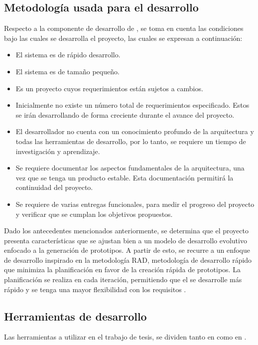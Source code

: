\subsection*{Metodología usada para el desarrollo}
Respecto a la componente de desarrollo de , se toma en cuenta las condiciones bajo las cuales se desarrolla el proyecto, las cuales se expresan a continuación:

\newpage
\begin{itemize}
	\item El sistema es de rápido desarrollo.
	\item El sistema es de tamaño pequeño.
	\item Es un proyecto cuyos requerimientos están sujetos a cambios.
	\item Inicialmente no existe un número total de requerimientos especificado. Estos se irán desarrollando de forma creciente durante el avance del proyecto.
	\item El desarrollador no cuenta con un conocimiento profundo de la arquitectura y todas las herramientas de desarrollo, por lo tanto, se requiere un tiempo de investigación y aprendizaje.   
	\item Se requiere documentar los aspectos fundamentales de la arquitectura, una vez que se tenga un producto estable. Esta documentación permitirá la continuidad del proyecto. 
	\item Se requiere de varias entregas funcionales, para medir el progreso del proyecto y verificar que se cumplan los objetivos propuestos.
\end{itemize}

Dado los antecedentes mencionados anteriormente, se determina que el proyecto presenta características que se ajustan bien a un modelo de desarrollo evolutivo enfocado a la generación de prototipos. A partir de esto, se recurre a un enfoque de desarrollo inspirado en la metodología RAD, metodología de desarrollo rápido que minimiza la planificación en favor de la creación rápida de prototipos. La planificación se realiza en cada iteración, permitiendo que el  se desarrolle más rápido y se tenga una mayor flexibilidad con los requisitos \parencite{mcconnell1996rapid}.

\subsection{Herramientas de desarrollo}
\label{subsec:herramientas}
Las herramientas a utilizar en el trabajo de tesis, se dividen tanto en  como en .

